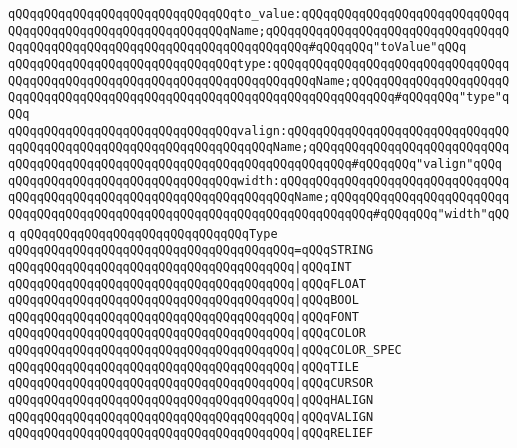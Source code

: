 \verb|qQQqqQQqqQQqqQQqqQQqqQQqqQQqqQQqto_value:qQQqqQQqqQQqqQQqqQQqqQQqqQQqqQQqqQQqqQQqqQQqqQQqqQQqqQQqqQQqName;qQQqqQQqqQQqqQQqqQQqqQQqqQQqqQQqqQQqqQQqqQQqqQQqqQQqqQQqqQQqqQQqqQQqqQQqqQQq#qQQqqQQq"toValue"qQQq|\newline
\verb|qQQqqQQqqQQqqQQqqQQqqQQqqQQqqQQqtype:qQQqqQQqqQQqqQQqqQQqqQQqqQQqqQQqqQQqqQQqqQQqqQQqqQQqqQQqqQQqqQQqqQQqqQQqqQQqName;qQQqqQQqqQQqqQQqqQQqqQQqqQQqqQQqqQQqqQQqqQQqqQQqqQQqqQQqqQQqqQQqqQQqqQQqqQQq#qQQqqQQq"type"qQQq|\newline
\newline
\verb|qQQqqQQqqQQqqQQqqQQqqQQqqQQqqQQqvalign:qQQqqQQqqQQqqQQqqQQqqQQqqQQqqQQqqQQqqQQqqQQqqQQqqQQqqQQqqQQqqQQqqQQqName;qQQqqQQqqQQqqQQqqQQqqQQqqQQqqQQqqQQqqQQqqQQqqQQqqQQqqQQqqQQqqQQqqQQqqQQqqQQq#qQQqqQQq"valign"qQQq|\newline
\verb|qQQqqQQqqQQqqQQqqQQqqQQqqQQqqQQqwidth:qQQqqQQqqQQqqQQqqQQqqQQqqQQqqQQqqQQqqQQqqQQqqQQqqQQqqQQqqQQqqQQqqQQqqQQqName;qQQqqQQqqQQqqQQqqQQqqQQqqQQqqQQqqQQqqQQqqQQqqQQqqQQqqQQqqQQqqQQqqQQqqQQqqQQq#qQQqqQQq"width"qQQq|\newline
\newline
\verb|qQQqqQQqqQQqqQQqqQQqqQQqqQQqqQQqType|\newline
\verb|qQQqqQQqqQQqqQQqqQQqqQQqqQQqqQQqqQQqqQQq=qQQqSTRING|\newline
\verb|qQQqqQQqqQQqqQQqqQQqqQQqqQQqqQQqqQQqqQQq|\verb#|qQQqINT#\newline
\verb|qQQqqQQqqQQqqQQqqQQqqQQqqQQqqQQqqQQqqQQq|\verb#|qQQqFLOAT#\newline
\verb|qQQqqQQqqQQqqQQqqQQqqQQqqQQqqQQqqQQqqQQq|\verb#|qQQqBOOL#\newline
\verb|qQQqqQQqqQQqqQQqqQQqqQQqqQQqqQQqqQQqqQQq|\verb#|qQQqFONT#\newline
\verb|qQQqqQQqqQQqqQQqqQQqqQQqqQQqqQQqqQQqqQQq|\verb#|qQQqCOLOR#\newline
\verb|qQQqqQQqqQQqqQQqqQQqqQQqqQQqqQQqqQQqqQQq|\verb#|qQQqCOLOR_SPEC#\newline
\verb|qQQqqQQqqQQqqQQqqQQqqQQqqQQqqQQqqQQqqQQq|\verb#|qQQqTILE#\newline
\verb|qQQqqQQqqQQqqQQqqQQqqQQqqQQqqQQqqQQqqQQq|\verb#|qQQqCURSOR#\newline
\verb|qQQqqQQqqQQqqQQqqQQqqQQqqQQqqQQqqQQqqQQq|\verb#|qQQqHALIGN#\newline
\verb|qQQqqQQqqQQqqQQqqQQqqQQqqQQqqQQqqQQqqQQq|\verb#|qQQqVALIGN#\newline
\verb|qQQqqQQqqQQqqQQqqQQqqQQqqQQqqQQqqQQqqQQq|\verb#|qQQqRELIEF#\newline

